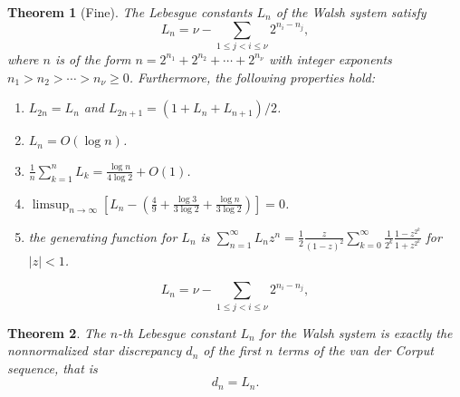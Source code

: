 \documentclass[10pt,a4paper]{amsart}
\newtheorem{theorem}{Theorem}
\begin{document}
\begin{theorem}[Fine]\label{thm:fine}
The Lebesgue constants $L_n$ of the Walsh system satisfy 
\begin{equation}\label{fo:LCW}
L_n=\nu-\sum_{1 \le j < i \le \nu} 2^{n_i-n_{j}},
\end{equation}
where $n$ is of the form $n=2^{n_1}+2^{n_2}+\cdots+2^{n_{\nu}}$ with integer exponents $n_1 > n_2 > \cdots > n_{\nu}\ge 0$. Furthermore, the following properties hold:
\begin{enumerate}
\item $L_{2n}=L_n$ and $L_{2n+1}=(1+L_n+L_{n+1})/2$.
\item $L_n=O(\log n)$.
\item $\frac{1}{n} \sum_{k=1}^n L_k =\frac{\log n}{4 \log 2}+O(1)$.
\item $\limsup_{n \rightarrow \infty} \left[L_n-\left(\frac{4}{9}+\frac{\log 3}{3 \log 2}+\frac{\log n}{3 \log 2}\right)\right]=0$.
\item the generating function for $L_n$ is $\sum_{n=1}^{\infty} L_n z^n =\frac{1}{2} \frac{z}{(1-z)^2} \sum_{k=0}^{\infty}\frac{1}{2^k} \frac{1-z^{2^k}}{1+z^{2^k}}$ for $|z|<1$.
\end{enumerate}
\end{theorem}

\begin{equation}
L_n=\nu-\sum_{1 \le j < i \le \nu} 2^{n_i-n_{j}},
\end{equation}

\begin{theorem}\label{thm2}
The $n$-th Lebesgue constant $L_n$ for the Walsh system is exactly the nonnormalized star discrepancy $d_n$ of the first $n$ terms of the van der Corput sequence, that is $$d_n=L_n.$$ 
\end{theorem}
\end{document}
